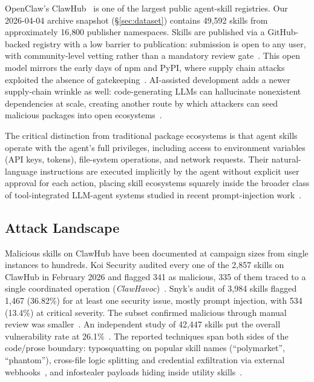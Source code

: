 \documentclass[sigconf,nonacm]{acmart}
\begin{document}
OpenClaw's ClawHub~\cite{clawhub2026} is one of the largest public agent-skill registries. Our 2026-04-04 archive snapshot (\S\ref{sec:dataset}) contains 49{,}592 skills from approximately 16{,}800 publisher namespaces. Skills are published via a GitHub-backed registry with a low barrier to publication: submission is open to any user, with community-level vetting rather than a mandatory review gate~\cite{hkcert2026}. This open model mirrors the early days of npm and PyPI, where supply chain attacks exploited the absence of gatekeeping~\cite{ohm2020backstabber}. AI-assisted development adds a newer supply-chain wrinkle as well: code-generating LLMs can hallucinate nonexistent dependencies at scale, creating another route by which attackers can seed malicious packages into open ecosystems~\cite{packagehallucinations2024}.

The critical distinction from traditional package ecosystems is that agent skills operate with the agent's full privileges, including access to environment variables (API keys, tokens), file-system operations, and network requests. Their natural-language instructions are executed implicitly by the agent without explicit user approval for each action, placing skill ecosystems squarely inside the broader class of tool-integrated LLM-agent systems studied in recent prompt-injection work~\cite{instructionhierarchy2024,injecagent2024,agentworkflowthreats2025}.

\subsection{Attack Landscape}

Malicious skills on ClawHub have been documented at campaign sizes from single instances to hundreds. Koi Security audited every one of the 2{,}857 skills on ClawHub in February 2026 and flagged 341 as malicious, 335 of them traced to a single coordinated operation (\emph{ClawHavoc})~\cite{clawhavoc2026}. Snyk's audit of 3{,}984 skills flagged 1{,}467 (36.82\%) for at least one security issue, mostly prompt injection, with 534 (13.4\%) at critical severity. The subset confirmed malicious through manual review was smaller~\cite{snyk2026toxicskills}. An independent study of 42{,}447 skills put the overall vulnerability rate at 26.1\%~\cite{liu2026agentskillswild}. The reported techniques span both sides of the code/prose boundary: typosquatting on popular skill names (``polymarket'', ``phantom''), cross-file logic splitting and credential exfiltration via external webhooks~\cite{clawhavoc2026}, and infostealer payloads hiding inside utility skills~\cite{trendmicro2026}.
\end{document}
